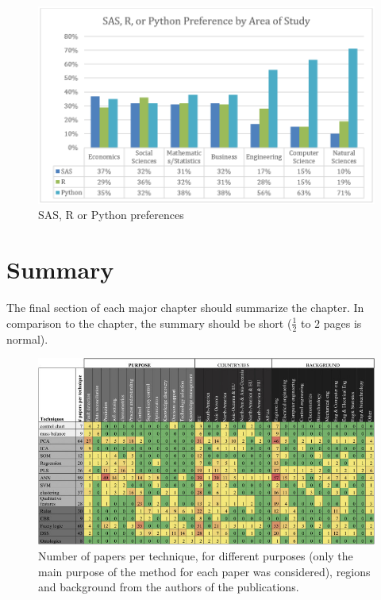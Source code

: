 

\begin{figure}[t]
\centering
\includegraphics[width=16cm]{figures/Ch3/BigDataTools.PNG}
\caption{SAS, R or Python preferences \cite{Siddiqui2015}}
\label{f:soft-preferences}
\end{figure}

\section{Summary}
\label{s:Related-Works-Summary}

The final section of each major chapter should summarize the chapter. In comparison to the chapter, the summary should be short ($\frac{1}{2}$ to $2$ pages is normal).

\begin{figure}[t]
\centering
\includegraphics[width=\linewidth]{figures/Ch3/PaperTable.jpg}
\caption{Number of papers per technique, for different purposes (only the main purpose of the method for each paper was considered), regions and background from the authors of the publications.}
\label{f:Papers Table}
\end{figure}
